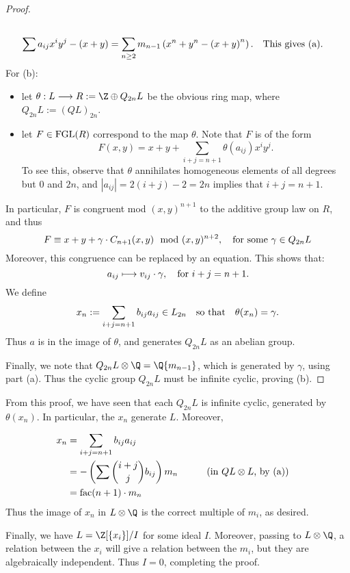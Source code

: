 \documentclass[11pt]{article}
\newcommand{\FGL}{\textup{FGL}}
\begin{document}
\begin{Formal Group Laws}
\begin{itemise}
\begin{proof}
\begin{alignat*}{2}
\\\sum a_{ij}x^iy^j-(x+y)&=\sum_{n\geq2}m_{n-1} \left(x^n+y^n-\left(x+y\right)^n\right).&& \textup{This gives (a).}
\end{alignat*}
For (b):
\begin{itemize}\squishlist
\item let $\theta:L\to R:=\Z\oplus Q_{2n}L$ be the obvious ring map, where $Q_{2n}L:=(QL)_{2n}$. 
\item let $F\in\FGL(R)$ correspond to the map $\theta$. Note that $F$ is of the form 
\[F(x,y)=x+y+\sum_{i+j=n+1}\theta(a_{ij})x^iy^j.\]
 To see this, observe that $\theta$ annihilates homogeneous elements of all degrees but 0 and $2n$, and $|a_{ij}|=2(i+j)-2=2n$ implies that $i+j=n+1$.
\end{itemize}
In particular, $F$ is congruent mod $(x,y)^{n+1}$ to the additive group law on $R$, and thus
\[F\equiv x+y+\gamma\cdot C_{n+1}(x,y)\mod{(x,y)^{n+2}},\textup{\quad for some $\gamma\in Q_{2n}L$}\]
Moreover, this congruence can be replaced by an equation. This shows that:
\[a_{ij}\mapsto v_{ij}\cdot \gamma,\textup{\quad for $i+j=n+1$.}\]
We define
\[x_{n}:=\sum_{i+j=n+1} b_{ij}a_{ij}\in L_{2n}\textup{\quad so that\quad }\theta(x_{n})=\gamma.\]
Thus $a$ is in the image of $\theta$, and generates $Q_{2n}L$ as an abelian group.

\INDENT Finally, we note that $Q_{2n}L\otimes\Q=\Q\{m_{n-1}\}$, which is generated by $\gamma$, using part (a). Thus the cyclic group $Q_{2n}L$ must be infinite cyclic, proving (b).
\end{proof}
\item From this proof, we have seen that each $Q_{2n}L$ is infinite cyclic, generated by $\theta(x_{n})$. In particular, the $x_n$ generate $L$. Moreover,

\begin{alignat*}{2}
x_n&=
\sum_{i+j=n+1} b_{ij}a_{ij}%
\\
&=
-\left(\sum{i+j\choose j}b_{ij}\right)m_{n}%
&\qquad&\text{(in $QL\otimes L$, by (a))} \\
&=
\textup{fac}(n+1)\cdot m_n%
 \end{alignat*}
Thus the image of $x_n$ in ${L}\otimes{\Q}$ is the correct multiple of $m_i$, as desired.
\item Finally, we have $L=\Z[\{x_i\}]/I$ for some ideal $I$. Moreover, passing to ${L}\otimes{\Q}$, a relation between the $x_i$ will give a relation between the $m_i$, but they are algebraically independent. Thus $I=0$, completing the proof.
\end{itemise}
\begin{shaded}

\end{shaded}
\end{Formal Group Laws}
\end{document}
